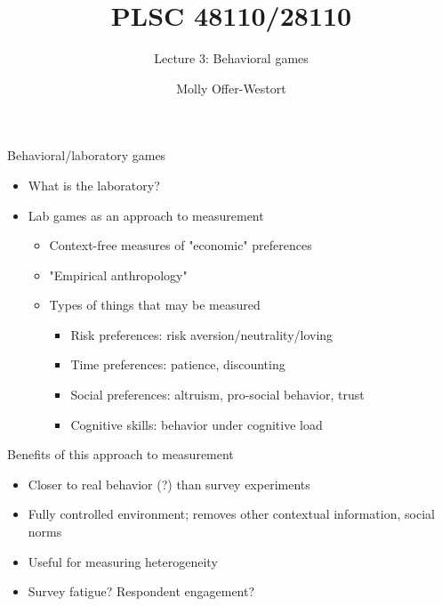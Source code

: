 \documentclass[xcolor={dvipsnames},handout]{beamer}
\title{PLSC 48110/28110}
\subtitle{Lecture 3: Behavioral games}
\date{}
\author{Molly Offer-Westort}
\institute{Department of Political Science, \\University of Chicago}
\begin{document}
\frame{\titlepage
\thispagestyle{empty}
}
\begin{frame}{Behavioral/laboratory games}


\begin{itemize}
\item What is the laboratory?
\item Lab games as an approach to measurement
\begin{itemize}
\item Context-free measures of "economic" preferences 
\item "Empirical anthropology" 
\item Types of things that may be measured
\begin{itemize}
\item Risk preferences: risk aversion/neutrality/loving 
\item Time preferences: patience, discounting 
\item Social preferences: altruism, pro-social behavior, trust
\item Cognitive skills: behavior under cognitive load
\end{itemize}
\end{itemize}
\end{itemize}

\end{frame}



\begin{frame}{Benefits of this approach to measurement}


\begin{itemize}
\item Closer to real behavior (?) than survey experiments
\item Fully controlled environment; removes other contextual information, social norms 
\item Useful for measuring heterogeneity 
\item Survey fatigue? Respondent engagement?
\end{itemize}

\end{frame}
\end{document}
